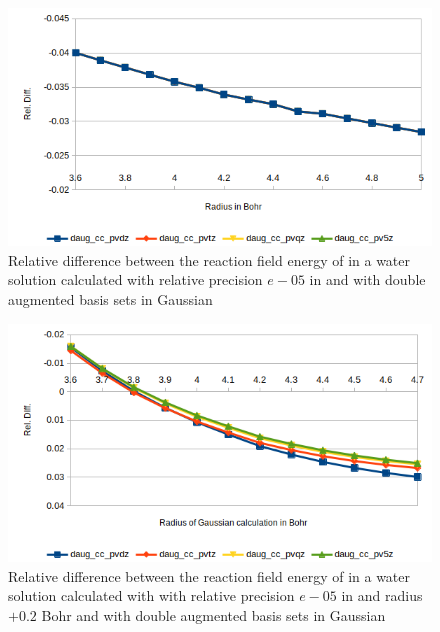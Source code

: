 \documentclass[../master_thesis.tex]{subfiles}
\begin{document}
\begin{figure}[!htb]
  \centering
  \includegraphics[width=\linewidth]{img/lipdaugreldiff.png}
  \caption[Relative difference of  against Gaussian double augmented results]{Relative difference between the reaction field energy of  in a water solution calculated with relative precision $e-05$ in \mrchem
  and with double augmented basis sets in Gaussian}
  \label{fig:lipreldiffdaug}
\end{figure}



\begin{figure}[!htb]
  \centering
    \includegraphics[width=\linewidth]{img/watdaugreldiff02.png}
  \caption[Relative difference of shifted radius  against Gaussian double augmented results]{Relative difference between the reaction field energy of  in a water solution calculated with with relative precision $e-05$ in \mrchem and radius $+ 0.2$ Bohr
  and with double augmented basis sets in Gaussian}
  \label{fig:watreldiff02daug}
\end{figure}
\end{document}

